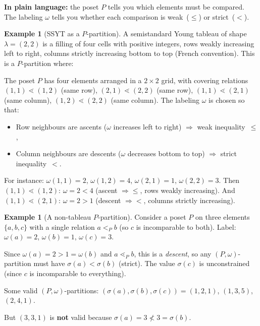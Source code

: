 \documentclass[11pt]{article}
\theoremstyle{plain}
\theoremstyle{definition}
\newtheorem{example}[theorem]{Example}
\theoremstyle{remark}
\begin{document}
\noindent
\textbf{In plain language:}  the poset $P$ tells you which
elements must be compared.  The labeling $\omega$ tells you
whether each comparison is weak~($\leq$) or strict~($<$).

\begin{example}[SSYT as a $P$-partition]\label{ex:ssyt-as-P}
A semistandard Young tableau of shape $\lambda = (2,2)$ is a
filling of four cells with positive integers, rows weakly
increasing left to right, columns strictly increasing bottom
to top (French convention).  This is a $P$-partition where:

\smallskip
The poset $P$ has four elements arranged in a $2 \times 2$ grid,
with covering relations
$(1,1) \lessdot (1,2)$ (same row),
$(2,1) \lessdot (2,2)$ (same row),
$(1,1) \lessdot (2,1)$ (same column),
$(1,2) \lessdot (2,2)$ (same column).
The labeling $\omega$ is chosen so that:
\begin{itemize}
\item Row neighbours are ascents ($\omega$ increases left to right)
  $\Rightarrow$ weak inequality~$\leq$,
\item Column neighbours are descents ($\omega$ decreases bottom
  to top) $\Rightarrow$ strict inequality~$<$.
\end{itemize}
For instance:
$\omega(1,1) = 2$, $\omega(1,2) = 4$,
$\omega(2,1) = 1$, $\omega(2,2) = 3$.
Then $(1,1) \lessdot (1,2)$: $\omega = 2 < 4$ (ascent $\Rightarrow \leq$, rows weakly increasing).
And $(1,1) \lessdot (2,1)$: $\omega = 2 > 1$ (descent $\Rightarrow <$, columns strictly increasing).
\end{example}

\begin{example}[A non-tableau $P$-partition]\label{ex:non-tableau-P}
Consider a poset $P$ on three elements $\{a, b, c\}$ with
a single relation $a <_P b$ (so $c$ is incomparable to both).
Label: $\omega(a) = 2$, $\omega(b) = 1$, $\omega(c) = 3$.

Since $\omega(a) = 2 > 1 = \omega(b)$ and $a \lessdot_P b$,
this is a \emph{descent}, so any $(P,\omega)$-partition must
have $\sigma(a) < \sigma(b)$ (strict).  The value $\sigma(c)$
is unconstrained (since $c$ is incomparable to everything).

Some valid $(P,\omega)$-partitions:
$(\sigma(a), \sigma(b), \sigma(c)) = (1, 2, 1)$,\;
$(1, 3, 5)$,\; $(2, 4, 1)$.

\noindent
But $(3, 3, 1)$ is \textbf{not} valid because
$\sigma(a) = 3 \not< 3 = \sigma(b)$.
\end{example}
\end{document}
